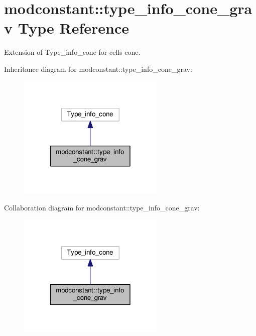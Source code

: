 \hypertarget{structmodconstant_1_1type__info__cone__grav}{\section{modconstant\-:\-:type\-\_\-info\-\_\-cone\-\_\-grav Type Reference}
\label{structmodconstant_1_1type__info__cone__grav}
}


Extension of Type\-\_\-info\-\_\-cone for cells cone.  




Inheritance diagram for modconstant\-:\-:type\-\_\-info\-\_\-cone\-\_\-grav\-:\nopagebreak
\begin{figure}[H]
\begin{center}
\leavevmode
\includegraphics[width=198pt]{structmodconstant_1_1type__info__cone__grav__inherit__graph}
\end{center}
\end{figure}


Collaboration diagram for modconstant\-:\-:type\-\_\-info\-\_\-cone\-\_\-grav\-:\nopagebreak
\begin{figure}[H]
\begin{center}
\leavevmode
\includegraphics[width=198pt]{structmodconstant_1_1type__info__cone__grav__coll__graph}
\end{center}
\end{figure}
